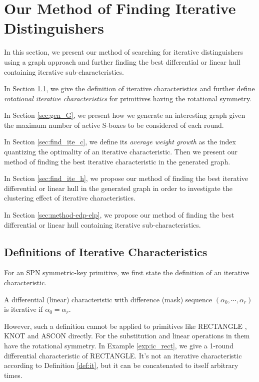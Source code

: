 \section{Our Method of Finding Iterative Distinguishers}\label{sec:method_ite}

In this section, we present our method of searching for iterative distinguishers using a graph approach and further finding the best differential or linear hull containing iterative sub-characteristics. 

In Section \ref{sec:def-it}, we give the definition of iterative characteristics and further define \textit{rotational iterative characteristics} for primitives having the rotational symmetry. 

In Section \ref{sec:gen_G}, we present how we generate an interesting graph given the maximum number of active S-boxes to be considered of each round. 

In Section \ref{sec:find_ite_c}, we define its \textit{average weight growth} as the index quantizing the optimality of an iterative characteristic. Then we present our method of finding the best iterative characteristic in the generated graph. 

In Section \ref{sec:find_ite_h}, we propose our method of finding the best iterative differential or linear hull in the generated graph in order to investigate the clustering effect of iterative characteristics. 

In Section \ref{sec:method-edp-elp}, we propose our method of finding the best differential or linear hull containing iterative sub-characteristics. 

\subsection{Definitions of Iterative Characteristics}\label{sec:def-it}

For an SPN symmetric-key primitive, we first state the definition of an iterative characteristic. 
\begin{definition}\label{def:it}
	A differential (linear) characteristic with difference (mask) sequence $(\alpha_0,\cdots,\alpha_r)$ is iterative if $\alpha_0=\alpha_r$.
\end{definition}

However, such a definition cannot be applied to primitives like RECTANGLE \cite{zhang2015rectangle}, KNOT \cite{zhang2019knot} and ASCON \cite{dobraunig2016ascon} directly. For the substitution and linear operations in them have the rotational symmetry. In Example \ref{exp:ic_rect}, we give a 1-round differential characteristic of RECTANGLE. It's not an iterative characteristic according to Definition \ref{def:it}, but it can be concatenated to itself arbitrary times. 

